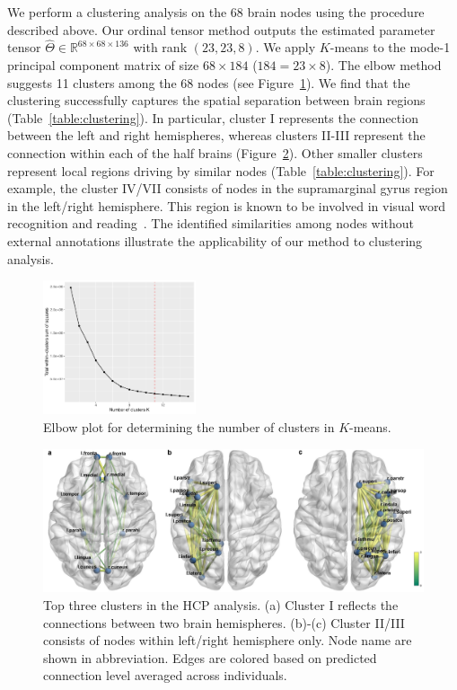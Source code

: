 \documentclass{article}
\theoremstyle{plain}
\theoremstyle{definition}
\begin{document}
We perform a clustering analysis on the 68 brain nodes using the procedure described above. Our ordinal tensor method outputs the estimated parameter tensor $\hat\Theta\in\mathbb{R}^{68\times 68\times136}$ with rank $(23,23,8)$. We apply $K$-means to the mode-1 principal component matrix of size $68\times 184$ ($184=23\times8$). The elbow method suggests 11 clusters among the 68 nodes (see Figure~\ref{figure:elbow}). We find that the clustering successfully captures the spatial separation between brain regions (Table~\ref{table:clustering}).
In particular, cluster I represents the connection between the left and right hemispheres, whereas clusters II-III represent the connection within each of the half brains (Figure~\ref{figure:brain image}). Other smaller clusters represent local regions driving by similar nodes (Table~\ref{table:clustering}). For example, the cluster IV/VII consists of nodes in the supramarginal gyrus region in the left/right hemisphere. This region is known to be involved in visual word recognition and reading~\citep{stoeckel2009supramarginal}. The identified similarities among nodes without external annotations illustrate the applicability of our method to clustering analysis.

\begin{figure}[ht]
\begin{center}
\includegraphics[width=0.4\textwidth]{elbowm.pdf}
\end{center}
\caption{Elbow plot for determining the number of clusters in $K$-means.}\label{figure:elbow}
\end{figure}


\begin{figure}[H]
\centering
\includegraphics[width = .7\textwidth]{HCP.pdf}
\caption{Top three clusters in the HCP analysis. (a) Cluster I reflects the connections between two brain hemispheres. (b)-(c) Cluster II/III consists of nodes within left/right hemisphere only. Node name are shown in abbreviation. Edges are colored based on predicted connection level averaged across individuals. }  \label{figure:brain image}
\end{figure}
\end{document}
